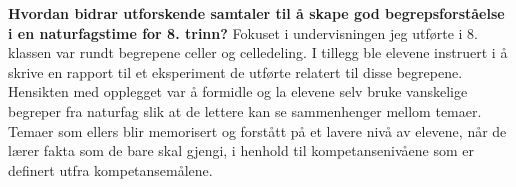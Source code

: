 \documentclass[main.tex]{subfiles}
\begin{document}
\newline
\newline
\textbf{Hvordan bidrar utforskende samtaler til å skape god begrepsforståelse i en naturfagstime 
for 8. trinn?}
\newline
\newline
Fokuset i undervisningen jeg utførte i 8. klassen var rundt begrepene celler og celledeling. 
I tillegg ble elevene instruert i å skrive en rapport til et eksperiment de utførte relatert 
til disse begrepene. Hensikten med opplegget var å formidle og la elevene selv bruke vanskelige 
begreper fra naturfag slik at de lettere kan se sammenhenger mellom temaer. Temaer som ellers
blir memorisert og forstått på et lavere nivå av elevene, når de lærer fakta som de bare skal
gjengi, i henhold til kompetansenivåene som er definert utfra kompetansemålene.
\end{document}
